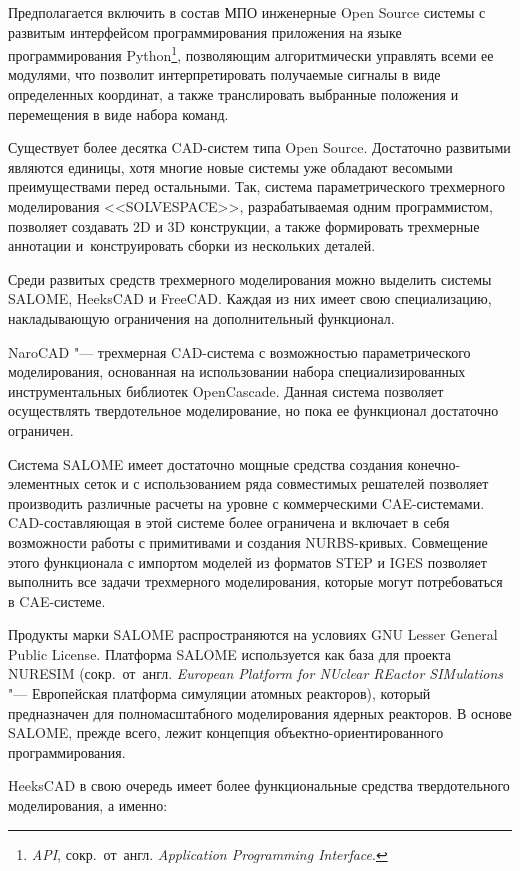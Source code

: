 Предполагается включить в состав \foreignlanguage{english}{МПО} инженерные Open Source системы с развитым интерфейсом программирования приложения на языке программирования \foreignlanguage{english}{Python}\footnote{\textit{API}, сокр.~от~англ. \textit{Application Programming Interface}.}, позволяющим алгоритмически управлять всеми ее модулями, что позволит интерпретировать получаемые сигналы в виде определенных координат, а также транслировать выбранные положения и перемещения в виде набора команд.

Существует более десятка CAD-систем типа Open Source. Достаточно развитыми являются единицы, хотя многие новые системы уже обладают весомыми преимуществами перед остальными. Так, система параметрического трехмерного моделирования <<SOLVESPACE>>, разрабатываемая одним программистом, позволяет создавать 2D и 3D конструкции, а также формировать трехмерные аннотации и~конструировать сборки из нескольких деталей.

Среди развитых средств трехмерного моделирования можно выделить системы SALOME, HeeksCAD и FreeCAD. Каждая из них имеет свою специализацию, накладывающую ограничения на дополнительный функционал.

NaroCAD "--- трехмерная CAD-система с возможностью параметрического моделирования, основанная на использовании набора специализированных инструментальных библиотек OpenCascade. Данная система позволяет осуществлять твердотельное моделирование, но пока ее функционал достаточно ограничен.

Система SALOME имеет достаточно мощные средства создания конечно-элементных сеток и с использованием ряда совместимых решателей позволяет производить различные расчеты на уровне с коммерческими CAE-системами. CAD-составляющая в этой системе более ограничена и включает в себя возможности работы с примитивами и создания NURBS-кривых. Совмещение этого функционала с импортом моделей из форматов STEP и IGES позволяет выполнить все задачи трехмерного моделирования, которые могут потребоваться в CAE-системе.

Продукты марки SALOME распространяются на условиях GNU Lesser General Public License. Платформа SALOME используется как база для проекта NURESIM (сокр.~от~англ. \textit{European Platform for NUclear REactor SIMulations} "--- Европейская платформа симуляции атомных реакторов), который предназначен для полномасштабного моделирования ядерных реакторов. В основе SALOME, прежде всего, лежит концепция объектно-ориентированного программирования.

HeeksCAD в свою очередь имеет более функциональные средства твердотельного моделирования, а именно:

